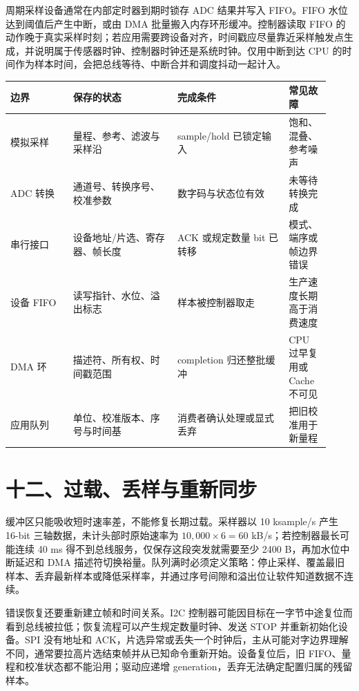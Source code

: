 周期采样设备通常在内部定时器到期时锁存 ADC 结果并写入 FIFO。FIFO 水位达到阈值后产生中断，或由 DMA 批量搬入内存环形缓冲。控制器读取 FIFO 的动作晚于真实采样时刻；若应用需要跨设备对齐，时间戳应尽量靠近采样触发点生成，并说明属于传感器时钟、控制器时钟还是系统时钟。仅用中断到达 CPU 的时间作为样本时间，会把总线等待、中断合并和调度抖动一起计入。

\begin{longtable}{L{0.18\linewidth}L{0.30\linewidth}L{0.32\linewidth}L{0.12\linewidth}}
\toprule
边界 & 保存的状态 & 完成条件 & 常见故障 \\
\midrule
模拟采样 & 量程、参考、滤波与采样沿 & sample/hold 已锁定输入 & 饱和、混叠、参考噪声 \\\tablerowrule
ADC 转换 & 通道号、转换序号、校准参数 & 数字码与状态位有效 & 未等待转换完成 \\\tablerowrule
串行接口 & 设备地址/片选、寄存器、帧长度 & ACK 或规定数量 bit 已转移 & 模式、端序或帧边界错误 \\\tablerowrule
设备 FIFO & 读写指针、水位、溢出标志 & 样本被控制器取走 & 生产速度长期高于消费速度 \\\tablerowrule
DMA 环 & 描述符、所有权、时间戳范围 & completion 归还整批缓冲 & CPU 过早复用或 Cache 不可见 \\\tablerowrule
应用队列 & 单位、校准版本、序号与时间基 & 消费者确认处理或显式丢弃 & 把旧校准用于新量程 \\
\bottomrule
\end{longtable}

\section{十二、过载、丢样与重新同步}

缓冲区只能吸收短时速率差，不能修复长期过载。采样器以 10 ksample/s 产生 16-bit 三轴数据，未计头部时原始速率为 $10{,}000\times6=60$ kB/s；若控制器最长可能连续 40 ms 得不到总线服务，仅保存这段突发就需要至少 2400 B，再加水位中断延迟和 DMA 描述符切换裕量。队列满时必须定义策略：停止采样、覆盖最旧样本、丢弃最新样本或降低采样率，并通过序号间隙和溢出位让软件知道数据不连续。

错误恢复还要重新建立帧和时间关系。I2C 控制器可能因目标在一字节中途复位而看到总线被拉低；恢复流程可以产生规定数量时钟、发送 STOP 并重新初始化设备。SPI 没有地址和 ACK，片选异常或丢失一个时钟后，主从可能对字边界理解不同，通常要拉高片选结束帧并从已知命令重新开始。设备复位后，旧 FIFO、量程和校准状态都不能沿用；驱动应递增 generation，丢弃无法确定配置归属的残留样本。

